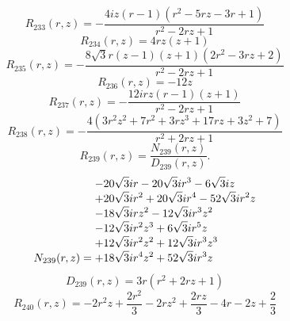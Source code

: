 \documentclass[11pt,a4paper]{article}
\begin{document}
\begin{equation}
R_{233}(r,z)=- \frac{4 i z \left(r - 1\right) \left(r^{2} - 5 r z - 3 r + 1\right)}{r^{2} - 2 r z + 1}
\label{eq:cat-rational-233}
\end{equation}
\begin{equation}
R_{234}(r,z)=4 r z \left(z + 1\right)
\label{eq:cat-rational-234}
\end{equation}
\begin{equation}
R_{235}(r,z)=- \frac{8 \sqrt{3} r \left(z - 1\right) \left(z + 1\right) \left(2 r^{2} - 3 r z + 2\right)}{r^{2} - 2 r z + 1}
\label{eq:cat-rational-235}
\end{equation}
\begin{equation}
R_{236}(r,z)=- 12 z
\label{eq:cat-rational-236}
\end{equation}
\begin{equation}
R_{237}(r,z)=- \frac{12 i r z \left(r - 1\right) \left(z + 1\right)}{r^{2} - 2 r z + 1}
\label{eq:cat-rational-237}
\end{equation}
\begin{equation}
R_{238}(r,z)=- \frac{4 \left(3 r^{2} z^{2} + 7 r^{2} + 3 r z^{3} + 17 r z + 3 z^{2} + 7\right)}{r^{2} + 2 r z + 1}
\label{eq:cat-rational-238}
\end{equation}
\begin{equation}
R_{239}(r,z)=\frac{N_{239}(r,z)}{D_{239}(r,z)}.
\label{eq:cat-rational-239}
\end{equation}
\begin{equation}
N_{239}(r,z)=\shortstack[l]{$\displaystyle  - 20 \sqrt{3} i r - 20 \sqrt{3} i r^{3} - 6 \sqrt{3} i z$\\
$\displaystyle  + 20 \sqrt{3} i r^{2} + 20 \sqrt{3} i r^{4} - 52 \sqrt{3} i r^{2} z$\\
$\displaystyle  - 18 \sqrt{3} i r z^{2} - 12 \sqrt{3} i r^{3} z^{2}$\\
$\displaystyle  - 12 \sqrt{3} i r^{2} z^{3} + 6 \sqrt{3} i r^{5} z$\\
$\displaystyle  + 12 \sqrt{3} i r^{2} z^{2} + 12 \sqrt{3} i r^{3} z^{3}$\\
$\displaystyle  + 18 \sqrt{3} i r^{4} z^{2} + 52 \sqrt{3} i r^{3} z$}
\label{eq:cat-numerator-239}
\end{equation}
\begin{equation}
D_{239}(r,z)=3 r \left(r^{2} + 2 r z + 1\right)
\label{eq:cat-denominator-239}
\end{equation}
\begin{equation}
R_{240}(r,z)=- 2 r^{2} z + \frac{2 r^{2}}{3} - 2 r z^{2} + \frac{2 r z}{3} - 4 r - 2 z + \frac{2}{3}
\label{eq:cat-rational-240}
\end{equation}
\end{document}
